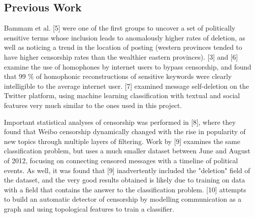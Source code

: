 \documentclass{article} %
\begin{document}
\begin{CJK*}{UTF8}{gbsn}
\section{Previous Work}

Bammam et al. [5] were one of the first groups to uncover a set of politically sensitive terms whose inclusion leads to anomalously higher rates of deletion, as well as noticing a trend in the location of posting (western provinces tended to have higher censorship rates than the wealthier eastern provinces). [3] and [6] examine the use of homophones by internet users to bypass censorship, and found that 99 \% of homophonic reconstructions of sensitive keywords were clearly intelligible to the average internet user. [7] examined message self-deletion on the Twitter platform, using machine learning classification with textual and social features very much similar to the ones used in this project. 

Important statistical analyses of censorship was performed in [8], where they found that Weibo censorship dynamically changed with the rise in popularity of new topics through multiple layers of filtering. Work by [9] examines the same classification problem, but uses a much smaller dataset between June and August of 2012, focusing on connecting censored messages with a timeline of political events. As well, it was found that [9] inadvertently included the "deletion" field of the dataset, and the very good results obtained is likely due to training on data with a field that contains the answer to the classification problem. [10] attempts to build an automatic detector of censorship by modelling communication as a graph and using topological features to train a classifier. 


\end{CJK*}
\end{document}
